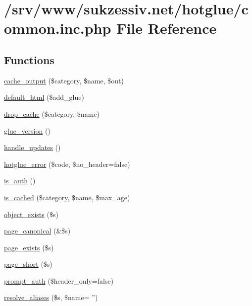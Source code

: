 \hypertarget{common_8inc_8php}{
\section{/srv/www/sukzessiv.net/hotglue/common.inc.php File Reference}
\label{common_8inc_8php}
}
\subsection*{Functions}
\begin{DoxyCompactItemize}
\item 
\hyperlink{common_8inc_8php_a6cceb5c6a3c421c18e925515c78f6dfd}{cache\_\-output} (\$category, \$name, \$out)
\item 
\hyperlink{common_8inc_8php_a8916cb6ec34ceeb3f48c86655c305974}{default\_\-html} (\$add\_\-glue)
\item 
\hyperlink{common_8inc_8php_a7ca47f8aab349971cde2d4b02441cf41}{drop\_\-cache} (\$category, \$name)
\item 
\hyperlink{common_8inc_8php_a0d6d0da45f4adf6283bcccec9fd107e3}{glue\_\-version} ()
\item 
\hyperlink{common_8inc_8php_aa8712e8d1a52e2b8f00ecaf839205d24}{handle\_\-updates} ()
\item 
\hyperlink{common_8inc_8php_a7c4cb31a76aaf90f4399752ef35e00fe}{hotglue\_\-error} (\$code, \$no\_\-header=false)
\item 
\hyperlink{common_8inc_8php_ab3abbb2cd13e01231533e7cdc93da6db}{is\_\-auth} ()
\item 
\hyperlink{common_8inc_8php_a6fb34b9210b43349ca3eb16b2738a28b}{is\_\-cached} (\$category, \$name, \$max\_\-age)
\item 
\hyperlink{common_8inc_8php_a3d71a269e01b98748fb57719feef27be}{object\_\-exists} (\$s)
\item 
\hyperlink{common_8inc_8php_a31ed04b0c90ac3077e71743c307d45f8}{page\_\-canonical} (\&\$s)
\item 
\hyperlink{common_8inc_8php_aa71868111dd5b8af98df9cc9c968e523}{page\_\-exists} (\$s)
\item 
\hyperlink{common_8inc_8php_ada968adfb989aa09adaf29867208f1ab}{page\_\-short} (\$s)
\item 
\hyperlink{common_8inc_8php_a80c23c9d8ac02159151d6368506b1b54}{prompt\_\-auth} (\$header\_\-only=false)
\item 
\hyperlink{common_8inc_8php_a78992fdfae6cd9d7d4e8053d004d1709}{resolve\_\-aliases} (\$s, \$name= '')

\end{DoxyCompactItemize}
